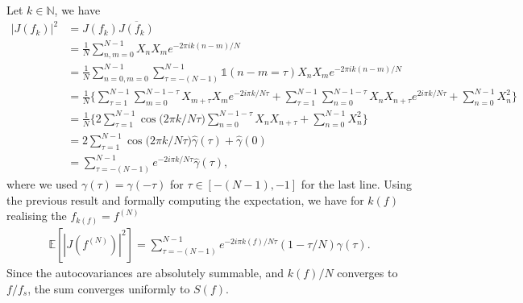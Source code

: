 \documentclass[11pt]{article}
\begin{document}
\begin{solution}
Let $k \in \mathbb{N}$, we have
    \begin{equation}
        \begin{split}
            |J(f_k)|^2 &= J(f_k)\overline{J(f_k)}\\
            &= \frac{1}{N}\sum_{n, m = 0}^{N-1} X_n X_m e^{-2\pi i k(n-m)/N}\\
            & = \frac{1}{N}\sum_{n=0,m=0}^{N-1}\sum_{\tau=-(N-1)}^{N-1} \mathds{1}(n-m=\tau) X_n X_m e^{-2\pi i k(n-m)/N}\\
            &= \frac{1}{N}\bigg\{\sum_{\tau=1}^{N-1}\sum_{m=0}^{N-1-\tau}X_{m+\tau}X_m e^{-2i\pi k /N \tau}+\sum_{\tau=1}^{N-1}\sum_{n=0}^{N-1-\tau}X_n X_{n+\tau}e^{2i\pi k/N \tau} + \sum_{n=0}^{N-1} X_n^2\bigg\}\\
            &= \frac{1}{N}\bigg\{2\sum_{\tau=1}^{N-1}\cos{\big(2\pi k / N \tau\big)}\sum_{n=0}^{N-1-\tau}X_nX_{n+\tau}+\sum_{n=0}^{N-1}X_n^2\bigg\}\\
            &= 2\sum_{\tau=1}^{N-1}\cos{\big(2\pi k / N \tau\big)}\hat{\gamma}(\tau) + \hat{\gamma}(0)\\
            &= \sum_{\tau=-(N-1)}^{N-1}e^{-2i\pi k / N \tau}\hat{\gamma}(\tau),
        \end{split}
    \end{equation}
    where we used $\gamma(\tau) = \gamma(-\tau)$ for $\tau \in [-(N-1), -1]$ for the last line.
    Using the previous result and formally computing the expectation, we have for $k(f)$ realising the $f_{k(f)} = f^{(N)}$
    \begin{equation}
        \begin{split}
            \mathbb{E}[|J(f^{(N)})|^2] = \sum_{\tau=-(N-1)}^{N-1}e^{-2i\pi k(f) /N \tau}(1-\tau/N)\gamma(\tau).
        \end{split}
    \end{equation}
    Since the autocovariances are absolutely summable, and $k(f)/N$ converges to $f/f_s$, the sum converges uniformly to $S(f)$.
\end{solution}
\end{document}
